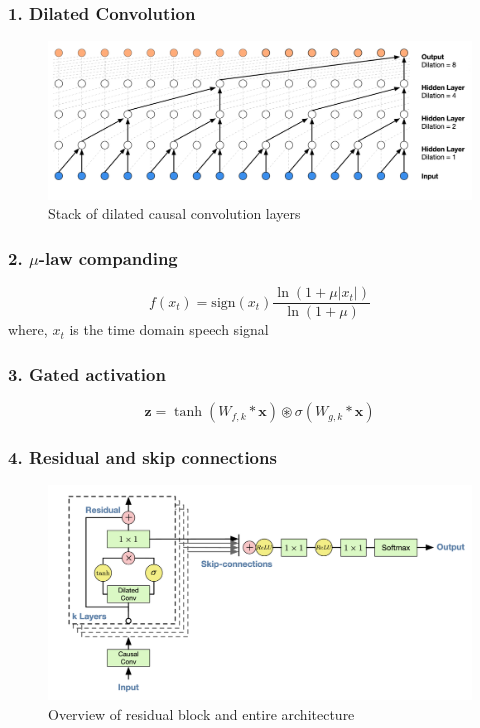 \documentclass{beamer}
\begin{document}
  \begin{frame}
    \frametitle{1. Dilated Convolution}
    \begin{figure}
      \includegraphics[scale=0.22]{images/wavenet_arch_dilated_conv.png}
      \caption{Stack of dilated causal convolution layers}
    \end{figure}
  \end{frame}

  \begin{frame}
    \frametitle{2. $\mu$-law companding}
    \centering
    \begin{equation*}
      f(x_t) = \text{sign}(x_t)\frac{\ln(1 + \mu|x_t|)}{\ln(1 + \mu)}
    \end{equation*}
    where, $x_t$ is the time domain speech signal
  \end{frame}

  \begin{frame}
    \frametitle{3. Gated activation}
    \centering
    \begin{equation*}
      \mathbf{z} = \tanh(W_{f, k}*\mathbf{x}) \circledast \sigma (W_{g, k}*\mathbf{x})
    \end{equation*}
  \end{frame}

  \begin{frame}
    \frametitle{4. Residual and skip connections}
    \begin{figure}[ht]
      \includegraphics[width=\textwidth]{images/wavenet_arch_residual.png}
      \caption{Overview of residual block and entire architecture }
    \end{figure}
  \end{frame}
\end{document}
